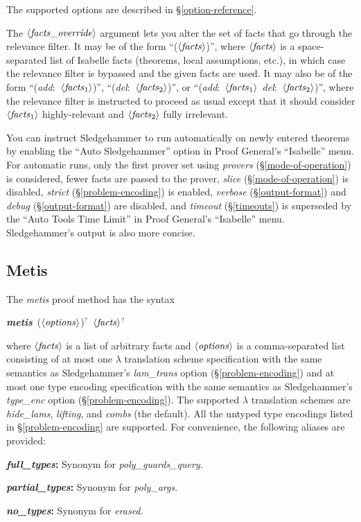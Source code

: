 \documentclass[a4paper,12pt]{article}
\def\qty#1{\ensuremath{\left<\mathit{#1\/}\right>}}
\begin{document}
The supported options are described in \S\ref{option-reference}.

The \qty{facts\_override} argument lets you alter the set of facts that go
through the relevance filter. It may be of the form ``(\qty{facts})'', where
\qty{facts} is a space-separated list of Isabelle facts (theorems, local
assumptions, etc.), in which case the relevance filter is bypassed and the given
facts are used. It may also be of the form ``(\textit{add}:\ \qty{facts\/_{\mathrm{1}}})'',
``(\textit{del}:\ \qty{facts\/_{\mathrm{2}}})'', or ``(\textit{add}:\ \qty{facts\/_{\mathrm{1}}}\
\textit{del}:\ \qty{facts\/_{\mathrm{2}}})'', where the relevance filter is instructed to
proceed as usual except that it should consider \qty{facts\/_{\mathrm{1}}}
highly-relevant and \qty{facts\/_{\mathrm{2}}} fully irrelevant.

You can instruct Sledgehammer to run automatically on newly entered theorems by
enabling the ``Auto Sledgehammer'' option in Proof General's ``Isabelle'' menu.
For automatic runs, only the first prover set using \textit{provers}
(\S\ref{mode-of-operation}) is considered, fewer facts are passed to the prover,
\textit{slice} (\S\ref{mode-of-operation}) is disabled, \textit{strict}
(\S\ref{problem-encoding}) is enabled, \textit{verbose} (\S\ref{output-format})
and \textit{debug} (\S\ref{output-format}) are disabled, and \textit{timeout}
(\S\ref{timeouts}) is superseded by the ``Auto Tools Time Limit'' in Proof
General's ``Isabelle'' menu. Sledgehammer's output is also more concise.

\subsection{Metis}

The \textit{metis} proof method has the syntax

\prew
\textbf{\textit{metis}}~(\qty{options})${}^?$~\qty{facts}${}^?$
\postw

where \qty{facts} is a list of arbitrary facts and \qty{options} is a
comma-separated list consisting of at most one $\lambda$ translation scheme
specification with the same semantics as Sledgehammer's \textit{lam\_trans}
option (\S\ref{problem-encoding}) and at most one type encoding specification
with the same semantics as Sledgehammer's \textit{type\_enc} option
(\S\ref{problem-encoding}).
%
The supported $\lambda$ translation schemes are \textit{hide\_lams},
\textit{lifting}, and \textit{combs} (the default).
%
All the untyped type encodings listed in \S\ref{problem-encoding} are supported.
For convenience, the following aliases are provided:
\begin{enum}
\item[\labelitemi] \textbf{\textit{full\_types}:} Synonym for \textit{poly\_guards\_query}.
\item[\labelitemi] \textbf{\textit{partial\_types}:} Synonym for \textit{poly\_args}.
\item[\labelitemi] \textbf{\textit{no\_types}:} Synonym for \textit{erased}.
\end{enum}
\end{document}

